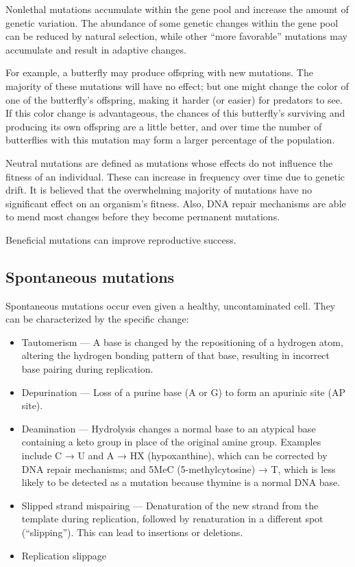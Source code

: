 Nonlethal mutations accumulate within the gene pool and increase the amount of genetic variation. The abundance of some genetic changes within the gene pool can be reduced by natural selection, while other ``more favorable'' mutations may accumulate and result in adaptive changes.

For example, a butterfly may produce offspring with new mutations. The majority of these mutations will have no effect; but one might change the color of one of the butterfly's offspring, making it harder (or easier) for predators to see. If this color change is advantageous, the chances of this butterfly's surviving and producing its own offspring are a little better, and over time the number of butterflies with this mutation may form a larger percentage of the population.

Neutral mutations are defined as mutations whose effects do not influence the fitness of an individual. These can increase in frequency over time due to genetic drift. It is believed that the overwhelming majority of mutations have no significant effect on an organism's fitness. Also, DNA repair mechanisms are able to mend most changes before they become permanent mutations.

Beneficial mutations can improve reproductive success.

\hypertarget{spontaneous-mutations}{%
\subsection{Spontaneous mutations}\label{spontaneous-mutations}}

Spontaneous mutations occur even given a healthy, uncontaminated cell. They can be characterized by the specific change:

\begin{itemize}
\tightlist
\item
  Tautomerism --- A base is changed by the repositioning of a hydrogen atom, altering the hydrogen bonding pattern of that base, resulting in incorrect base pairing during replication.
\item
  Depurination --- Loss of a purine base (A or G) to form an apurinic site (AP site).
\item
  Deamination --- Hydrolysis changes a normal base to an atypical base containing a keto group in place of the original amine group. Examples include C → U and A → HX (hypoxanthine), which can be corrected by DNA repair mechanisms; and 5MeC (5-methylcytosine) → T, which is less likely to be detected as a mutation because thymine is a normal DNA base.
\item
  Slipped strand mispairing --- Denaturation of the new strand from the template during replication, followed by renaturation in a different spot (``slipping''). This can lead to insertions or deletions.
\item
  Replication slippage
\end{itemize}

